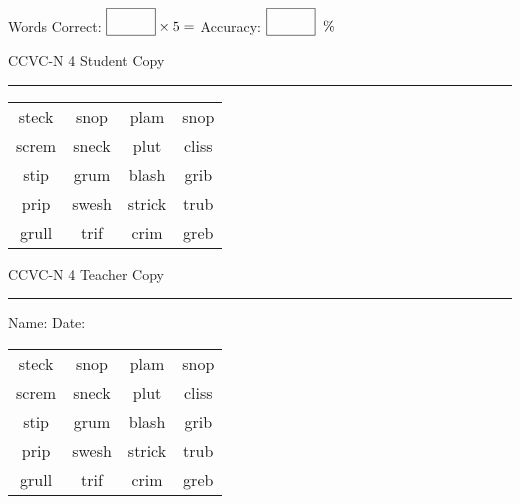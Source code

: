 \documentclass{memoir}
\begin{document}
\small

Words Correct: $\fbox{\phantom{\huge 100}} \times 5 = $ Accuracy: $\fbox{\phantom{\huge 100}}\;\; \%$ 

\vfill

\newpage


\footnotesize \noindent
CCVC-N 4 \hfill Student Copy
\smallskip
\hrule

\Large

\setlength{\tabcolsep}{14pt}
\def\arraystretch{3}

{\selectfont


\begin{vplace}[0.5]
\begin{center}
\begin{tabular}{cccc}
steck & snop & plam & snop \\
screm & sneck & plut & cliss             \\
stip & grum       & blash & grib     \\
prip & swesh & strick & trub \\
grull            & trif & crim & greb \\
\end{tabular}
\end{center}
\end{vplace}

}

\newpage

\footnotesize \noindent
CCVC-N 4 \hfill Teacher Copy
\smallskip
\hrule

\small

\vfill

\noindent
Name: \underline{\hspace{1.75in}} \hfill Date: \underline{\hspace{1in}}

\Large

{\selectfont


\begin{vplace}[0.5]
\begin{center}
\begin{tabular}{cccc}
steck & snop & plam & snop \\
screm & sneck & plut & cliss             \\
stip & grum       & blash & grib     \\
prip & swesh & strick & trub \\
grull            & trif & crim & greb \\
\end{tabular}
\end{center}
\end{vplace}



}
\end{document}
